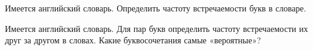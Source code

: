 
Имеется английский словарь. Определить частоту встречаемости букв в словаре.


Имеется английский словарь. Для пар букв определить частоту встречаемости их
друг за другом в словах. Какие буквосочетания самые «вероятные»?


